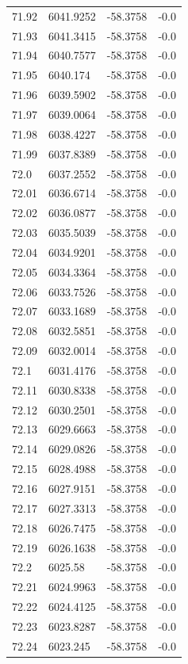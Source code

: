 \begin{table}[H]
\begin{tabular}{llll}
71.92 & 6041.9252 & -58.3758 & -0.0 \\
71.93 & 6041.3415 & -58.3758 & -0.0 \\
71.94 & 6040.7577 & -58.3758 & -0.0 \\
71.95 & 6040.174 & -58.3758 & -0.0 \\
71.96 & 6039.5902 & -58.3758 & -0.0 \\
71.97 & 6039.0064 & -58.3758 & -0.0 \\
71.98 & 6038.4227 & -58.3758 & -0.0 \\
71.99 & 6037.8389 & -58.3758 & -0.0 \\
72.0 & 6037.2552 & -58.3758 & -0.0 \\
72.01 & 6036.6714 & -58.3758 & -0.0 \\
72.02 & 6036.0877 & -58.3758 & -0.0 \\
72.03 & 6035.5039 & -58.3758 & -0.0 \\
72.04 & 6034.9201 & -58.3758 & -0.0 \\
72.05 & 6034.3364 & -58.3758 & -0.0 \\
72.06 & 6033.7526 & -58.3758 & -0.0 \\
72.07 & 6033.1689 & -58.3758 & -0.0 \\
72.08 & 6032.5851 & -58.3758 & -0.0 \\
72.09 & 6032.0014 & -58.3758 & -0.0 \\
72.1 & 6031.4176 & -58.3758 & -0.0 \\
72.11 & 6030.8338 & -58.3758 & -0.0 \\
72.12 & 6030.2501 & -58.3758 & -0.0 \\
72.13 & 6029.6663 & -58.3758 & -0.0 \\
72.14 & 6029.0826 & -58.3758 & -0.0 \\
72.15 & 6028.4988 & -58.3758 & -0.0 \\
72.16 & 6027.9151 & -58.3758 & -0.0 \\
72.17 & 6027.3313 & -58.3758 & -0.0 \\
72.18 & 6026.7475 & -58.3758 & -0.0 \\
72.19 & 6026.1638 & -58.3758 & -0.0 \\
72.2 & 6025.58 & -58.3758 & -0.0 \\
72.21 & 6024.9963 & -58.3758 & -0.0 \\
72.22 & 6024.4125 & -58.3758 & -0.0 \\
72.23 & 6023.8287 & -58.3758 & -0.0 \\
72.24 & 6023.245 & -58.3758 & -0.0 \\

\end{tabular}
\end{table}
